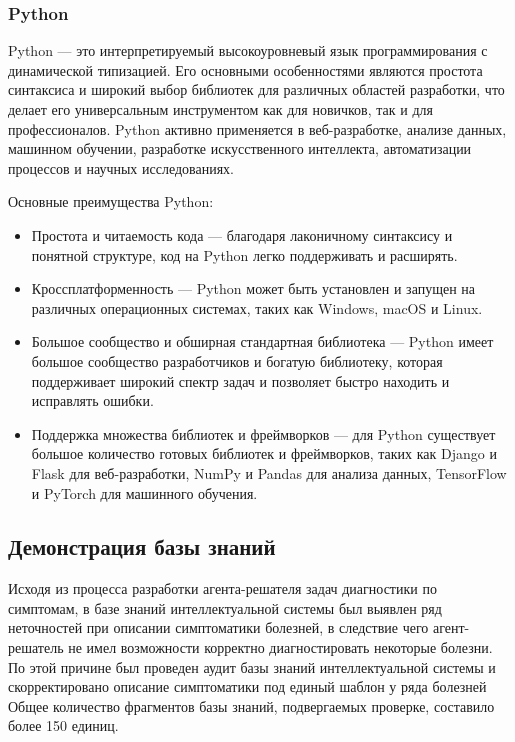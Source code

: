 \subsubsection{Python}

Python — это интерпретируемый высокоуровневый язык программирования с динамической типизацией. Его основными особенностями являются простота синтаксиса и широкий выбор библиотек для различных областей разработки, что делает его универсальным инструментом как для новичков, так и для профессионалов. Python активно применяется в веб-разработке, анализе данных, машинном обучении, разработке искусственного интеллекта, автоматизации процессов и научных исследованиях.

Основные преимущества Python:
\begin{itemize}
    \item Простота и читаемость кода — благодаря лаконичному синтаксису и понятной структуре, код на Python легко поддерживать и расширять.
    \item Кроссплатформенность — Python может быть установлен и запущен на различных операционных системах, таких как Windows, macOS и Linux.
    \item Большое сообщество и обширная стандартная библиотека — Python имеет большое сообщество разработчиков и богатую библиотеку, которая поддерживает широкий спектр задач и позволяет быстро находить и исправлять ошибки.
    \item Поддержка множества библиотек и фреймворков — для Python существует большое количество готовых библиотек и фреймворков, таких как Django и Flask для веб-разработки, NumPy и Pandas для анализа данных, TensorFlow и PyTorch для машинного обучения.
\end{itemize}


\subsection{Демонстрация базы знаний}

Исходя из процесса разработки агента-решателя задач диагностики по симптомам, в базе знаний интеллектуальной системы был выявлен ряд неточностей при описании симптоматики болезней, в следствие чего агент-решатель не имел возможности корректно диагностировать некоторые болезни. По этой причине был проведен аудит базы знаний интеллектуальной системы и скорректировано описание симптоматики под единый шаблон у ряда болезней Общее количество фрагментов базы знаний, подвергаемых проверке, составило более 150 единиц.

